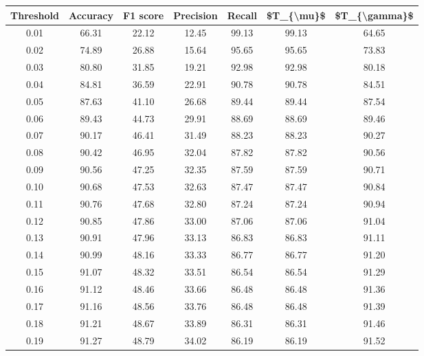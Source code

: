 \begin{tabular}{|c|c|c|c|c|c|c|}
\toprule
 Threshold &  Accuracy &  F1 score &  Precision &  Recall &  \$T\_\{\textbackslash mu\}\$ &  \$T\_\{\textbackslash gamma\}\$ \\
\hline
      0.01 &     66.31 &     22.12 &      12.45 &   99.13 &      99.13 &         64.65 \\
      0.02 &     74.89 &     26.88 &      15.64 &   95.65 &      95.65 &         73.83 \\
      0.03 &     80.80 &     31.85 &      19.21 &   92.98 &      92.98 &         80.18 \\
      0.04 &     84.81 &     36.59 &      22.91 &   90.78 &      90.78 &         84.51 \\
      0.05 &     87.63 &     41.10 &      26.68 &   89.44 &      89.44 &         87.54 \\
      0.06 &     89.43 &     44.73 &      29.91 &   88.69 &      88.69 &         89.46 \\
      0.07 &     90.17 &     46.41 &      31.49 &   88.23 &      88.23 &         90.27 \\
      0.08 &     90.42 &     46.95 &      32.04 &   87.82 &      87.82 &         90.56 \\
      0.09 &     90.56 &     47.25 &      32.35 &   87.59 &      87.59 &         90.71 \\
      0.10 &     90.68 &     47.53 &      32.63 &   87.47 &      87.47 &         90.84 \\
      0.11 &     90.76 &     47.68 &      32.80 &   87.24 &      87.24 &         90.94 \\
      0.12 &     90.85 &     47.86 &      33.00 &   87.06 &      87.06 &         91.04 \\
      0.13 &     90.91 &     47.96 &      33.13 &   86.83 &      86.83 &         91.11 \\
      0.14 &     90.99 &     48.16 &      33.33 &   86.77 &      86.77 &         91.20 \\
      0.15 &     91.07 &     48.32 &      33.51 &   86.54 &      86.54 &         91.29 \\
      0.16 &     91.12 &     48.46 &      33.66 &   86.48 &      86.48 &         91.36 \\
      0.17 &     91.16 &     48.56 &      33.76 &   86.48 &      86.48 &         91.39 \\
      0.18 &     91.21 &     48.67 &      33.89 &   86.31 &      86.31 &         91.46 \\
      0.19 &     91.27 &     48.79 &      34.02 &   86.19 &      86.19 &         91.52 \\

\end{tabular}
